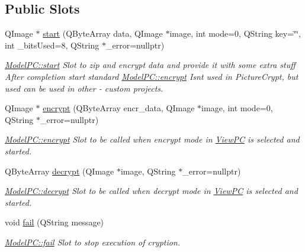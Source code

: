 \subsection*{Public Slots}
\begin{DoxyCompactItemize}
\item 
Q\+Image $\ast$ \mbox{\hyperlink{class_model_p_c_a3cae34fd5bcb06e8c1f8cfe7961bd270}{start}} (Q\+Byte\+Array data, Q\+Image $\ast$image, int mode=0, Q\+String key=\char`\"{}\char`\"{}, int \+\_\+bits\+Used=8, Q\+String $\ast$\+\_\+error=nullptr)
\begin{DoxyCompactList}\small\item\em \mbox{\hyperlink{class_model_p_c_a3cae34fd5bcb06e8c1f8cfe7961bd270}{Model\+P\+C\+::start}} Slot to zip and encrypt data and provide it with some extra stuff After completion start standard \mbox{\hyperlink{class_model_p_c_a8ef76567bc0c0307b4e2547c46536e51}{Model\+P\+C\+::encrypt}} Isn\textquotesingle{}t used in Picture\+Crypt, but used can be used in other -\/ custom projects. \end{DoxyCompactList}\item 
Q\+Image $\ast$ \mbox{\hyperlink{class_model_p_c_a8ef76567bc0c0307b4e2547c46536e51}{encrypt}} (Q\+Byte\+Array encr\+\_\+data, Q\+Image $\ast$image, int mode=0, Q\+String $\ast$\+\_\+error=nullptr)
\begin{DoxyCompactList}\small\item\em \mbox{\hyperlink{class_model_p_c_a8ef76567bc0c0307b4e2547c46536e51}{Model\+P\+C\+::encrypt}} Slot to be called when encrypt mode in \mbox{\hyperlink{class_view_p_c}{View\+PC}} is selected and started. \end{DoxyCompactList}\item 
Q\+Byte\+Array \mbox{\hyperlink{class_model_p_c_af1f0b21565bf39808c4cdd448fad0ea8}{decrypt}} (Q\+Image $\ast$image, Q\+String $\ast$\+\_\+error=nullptr)
\begin{DoxyCompactList}\small\item\em \mbox{\hyperlink{class_model_p_c_af1f0b21565bf39808c4cdd448fad0ea8}{Model\+P\+C\+::decrypt}} Slot to be called when decrypt mode in \mbox{\hyperlink{class_view_p_c}{View\+PC}} is selected and started. \end{DoxyCompactList}\item 
void \mbox{\hyperlink{class_model_p_c_a47464b59b7e37fcee25e55475708aabd}{fail}} (Q\+String message)
\begin{DoxyCompactList}\small\item\em \mbox{\hyperlink{class_model_p_c_a47464b59b7e37fcee25e55475708aabd}{Model\+P\+C\+::fail}} Slot to stop execution of cryption. \end{DoxyCompactList}\end{DoxyCompactItemize}
